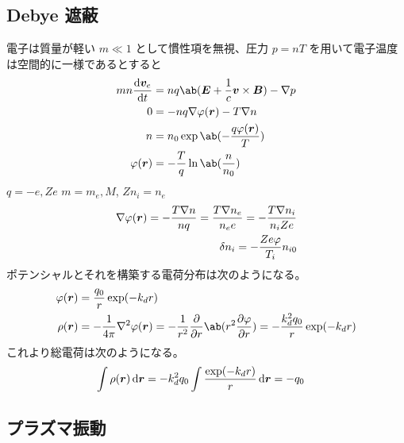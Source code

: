 \documentclass[a4paper,11pt]{jlreq}
\begin{document}
\subsection{Debye 遮蔽}
電⼦は質量が軽い $m \ll 1$ として慣性項を無視、圧力 $p = nT$ を用いて電⼦温度は空間的に⼀様であるとすると
\begin{align}
  mn\diff{\bm{v}_e}{t} & = nq\ab(\EE + \frac{1}{c}\bm{v}\times\BB) - \nabla p \\
  0                    & = -nq\nabla\varphi(\rr) - T\nabla n                  \\
  n                    & = n_0\exp\ab(-\frac{q\varphi(\rr)}{T})               \\
  \varphi(\rr)         & = -\frac{T}{q}\ln\ab(\frac{n}{n_0})
\end{align}
$q = -e, Ze$ $m = m_e, M$, $Zn_i = n_e$
\begin{align}
  \nabla\varphi(\bm{r}) = -\frac{T\nabla n}{nq} = \frac{T\nabla n_e}{n_ee} = -\frac{T\nabla n_i}{n_iZe} \\
  \delta n_i = - \frac{Ze\varphi}{T_i}n_{i0}
\end{align}
ポテンシャルとそれを構築する電荷分布は次のようになる。
\begin{align}
  \varphi(\rr) & = \frac{q_0}{r}\exp(-k_dr)                                                                                                    \\
  \rho(\rr)    & = -\frac{1}{4\pi}\nabla^2 \varphi(\rr) = -\frac{1}{r^2}\diffp{}{r}\ab(r^2\diffp{\varphi}{r}) = -\frac{k_d^2q_0}{r}\exp(-k_dr)
\end{align}
これより総電荷は次のようになる。
\begin{align}
  \int\rho(\rr)\dl{\rr} & = -k_d^2q_0\int\frac{\exp(-k_dr)}{r}\dl{\rr} = -q_0
\end{align}

\subsection{プラズマ振動}
\end{document}
